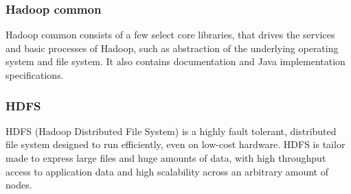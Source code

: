 \documentclass[a4paper,english]{report}
\begin{document}
		\subsubsection{Hadoop common}
		Hadoop common consists of a few select core libraries, that drives the services and basic processes of Hadoop, such as abstraction of the underlying operating system and file system. It also contains documentation and Java implementation specifications. 
		
		\subsubsection{HDFS}
		HDFS (Hadoop Distributed File System) is a highly fault tolerant, distributed file system designed to run efficiently, even on low-cost hardware. HDFS is tailor made to express large files and huge amounts of data, with high throughput access to application data and high scalability across an arbitrary amount of nodes.
		
\end{document}
